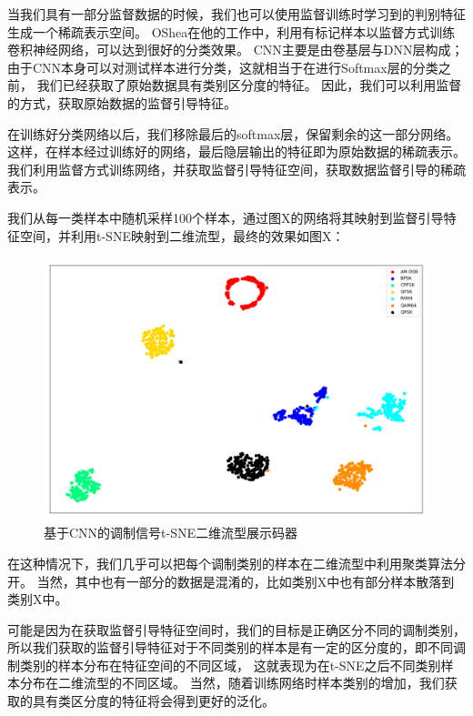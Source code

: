当我们具有一部分监督数据的时候，我们也可以使用监督训练时学习到的判别特征生成一个稀疏表示空间。
OShea在他的工作中，利用有标记样本以监督方式训练卷积神经网络，可以达到很好的分类效果。
CNN主要是由卷基层与DNN层构成；由于CNN本身可以对测试样本进行分类，这就相当于在进行Softmax层的分类之前，
我们已经获取了原始数据具有类别区分度的特征。
因此，我们可以利用监督的方式，获取原始数据的监督引导特征。\par

在训练好分类网络以后，我们移除最后的softmax层，保留剩余的这一部分网络。
这样，在样本经过训练好的网络，最后隐层输出的特征即为原始数据的稀疏表示。
我们利用监督方式训练网络，并获取监督引导特征空间，获取数据监督引导的稀疏表示。\par
我们从每一类样本中随机采样100个样本，通过图X的网络将其映射到监督引导特征空间，并利用t-SNE映射到二维流型，最终的效果如图X：
\begin{figure}[!h]
	\centering
	\includegraphics[scale=0.4]{figures/chapter_3/fig_3_7}
	\caption{基于CNN的调制信号t-SNE二维流型展示码器}	\label{sec:fig_3_7}
\end{figure}

在这种情况下，我们几乎可以把每个调制类别的样本在二维流型中利用聚类算法分开。
当然，其中也有一部分的数据是混淆的，比如类别X中也有部分样本散落到类别X中。\par
可能是因为在获取监督引导特征空间时，我们的目标是正确区分不同的调制类别，
所以我们获取的监督引导特征对于不同类别的样本是有一定的区分度的，即不同调制类别的样本分布在特征空间的不同区域，
这就表现为在t-SNE之后不同类别样本分布在二维流型的不同区域。
当然，随着训练网络时样本类别的增加，我们获取的具有类区分度的特征将会得到更好的泛化。\par



